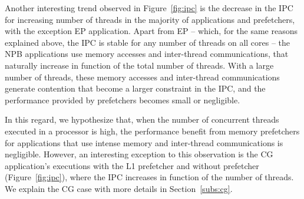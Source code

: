 \documentclass[AMA,final,STIX1COL]{WileyNJD-v2}
\newcommand\new[1]{{\color{red}{#1}}}
\begin{document}
Another interesting trend observed in Figure~\ref{fig:ipc} is the decrease in the IPC for increasing number of threads in the majority of applications and prefetchers, with the exception EP application.
Apart from EP -- which, for the same reasons explained above, the IPC is stable for any number of threads on all cores -- the NPB applications use memory accesses and inter-thread communications, that naturally increase in function of the total number of threads. 
With a large number of threads, these memory accesses and inter-thread communications generate contention that become a larger constraint in the IPC, and the performance provided by prefetchers becomes small or negligible. 
\new{This effect can be clearly seen in the IPC graph for the MG application: MG is known to use memory-intensive operations and to be communication-intensive, largely benefiting from memory prefetchers. 
However, as the number of threads increases, the contention becomes a more considerable constraint in the IPC results, significantly harming the performance.}


In this regard, we hypothesize that, when the number of concurrent threads executed in a processor is high, the performance benefit from memory prefetchers for applications that use intense memory and inter-thread communications is negligible. 
\new{These characteristics would need to be alleviated on the applications for memory prefetchers to be effective.} 
However, an interesting exception to this observation is the CG application's executions with the L1 prefetcher and without prefetcher (Figure~\ref{fig:ipc}), where the IPC increases in function of the number of threads. 
We explain the CG case with more details in Section~\ref{subs:cg}.
\end{document}
